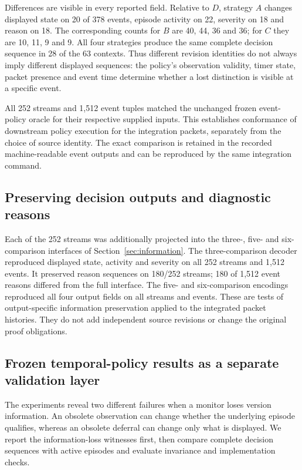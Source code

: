 \documentclass[preprint,11pt]{elsarticle}
\begin{document}
Differences are visible in every reported field. Relative to $D$, strategy $A$ changes displayed state on 20 of 378 events, episode activity on 22, severity on 18 and reason on 18. The corresponding counts for $B$ are 40, 44, 36 and 36; for $C$ they are 10, 11, 9 and 9. All four strategies produce the same complete decision sequence in 28 of the 63 contexts. Thus different revision identities do not always imply different displayed sequences: the policy's observation validity, timer state, packet presence and event time determine whether a lost distinction is visible at a specific event.

All 252 streams and 1,512 event tuples matched the unchanged frozen event-policy oracle for their respective supplied inputs. This establishes conformance of downstream policy execution for the integration packets, separately from the choice of source identity. The exact comparison is retained in the recorded machine-readable event outputs and can be reproduced by the same integration command.

\subsection{Preserving decision outputs and diagnostic reasons}\label{sec:bridge-representations}
Each of the 252 streams was additionally projected into the three-, five- and six-comparison interfaces of Section~\ref{sec:information}. The three-comparison decoder reproduced displayed state, activity and severity on all 252 streams and 1,512 events. It preserved reason sequences on 180/252 streams; 180 of 1,512 event reasons differed from the full interface. The five- and six-comparison encodings reproduced all four output fields on all streams and events. These are tests of output-specific information preservation applied to the integrated packet histories. They do not add independent source revisions or change the original proof obligations.

\subsection{Frozen temporal-policy results as a separate validation layer}

The experiments reveal two different failures when a monitor loses version information. An obsolete observation can change whether the underlying episode qualifies, whereas an obsolete deferral can change only what is displayed. We report the information-loss witnesses first, then compare complete decision sequences with active episodes and evaluate invariance and implementation checks.
\end{document}
